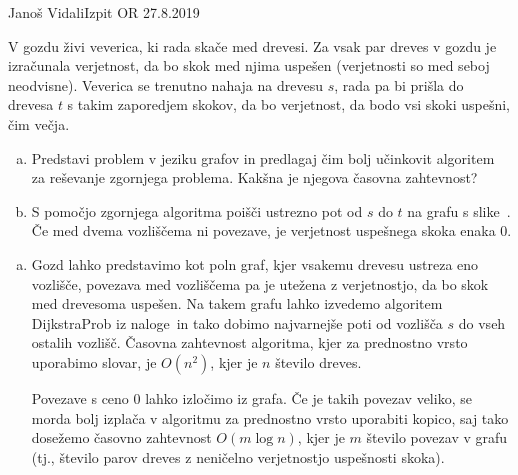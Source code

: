 \begin{naloga}{Janoš Vidali}{Izpit OR 27.8.2019}
\begin{vprasanje}
V gozdu živi veverica, ki rada skače med drevesi.
Za vsak par dreves v gozdu je izračunala ve\-rjet\-nost,
da bo skok med njima uspešen
(verjetnosti so med seboj neodvisne).
Veverica se trenutno nahaja na drevesu $s$,
rada pa bi prišla do drevesa $t$ s takim zaporedjem skokov,
da bo verjetnost, da bodo vsi skoki uspešni, čim večja.

\begin{enumerate}[(a)]
\item Predstavi problem v jeziku grafov
in predlagaj čim bolj učinkovit algoritem za reševanje zgornjega problema.
Kak\-šna je njegova časovna zahtevnost?

\item S pomočjo zgornjega algoritma poišči ustrezno pot
od $s$ do $t$ na grafu s slike~\fig.
Če med dvema vozliščema ni povezave,
je verjetnost uspešnega skoka enaka $0$.
\end{enumerate}

\begin{slika}
\pgfslika
{}
\end{slika}
\end{vprasanje}

\begin{odgovor}
\begin{enumerate}[(a)]
\item Gozd lahko predstavimo kot poln graf,
kjer vsakemu drevesu ustreza eno vozlišče,
povezava med vozliščema pa je utežena z verjetnostjo,
da bo skok med drevesoma uspešen.
Na takem grafu lahko izvedemo algoritem {\sc DijkstraProb}
iz naloge~\res[zaklad]
in tako dobimo najvarnejše poti od vozlišča $s$ do vseh ostalih vozlišč.
Časovna zahtevnost algoritma, kjer za prednostno vrsto uporabimo slovar,
je $O(n^2)$, kjer je $n$ število dreves.

Povezave s ceno $0$ lahko izločimo iz grafa.
Če je takih povezav veliko,
se morda bolj izplača v algoritmu za prednostno vrsto uporabiti kopico,
saj tako dosežemo časovno zahtevnost $O(m \log n)$,
kjer je $m$ število povezav v grafu
(tj., število parov dreves z neničelno verjetnostjo uspešnosti skoka).


\end{enumerate}
\end{odgovor}
\end{naloga}
